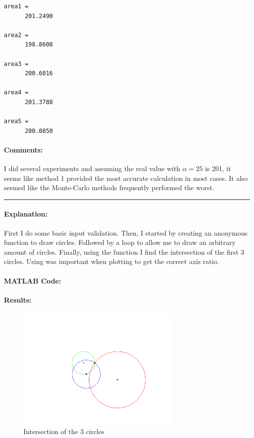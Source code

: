 \begin{verbatim}
area1 =
      201.2490

area2 =
      198.8608

area3 =
      200.6016

area4 =
      201.3788

area5 =
      200.0850
\end{verbatim}

\paragraph{Comments:}
I did several experiments and assuming the real value with $ \alpha =
25 $ is 201, it seems like method 1 provided the most accurate
calculation in most cases. It also seemed like the Monte-Carlo
methods frequently performed the worst.

\bigskip
\hrule


\paragraph{Explanation:}
First I do some basic input validation.
Then, I started by creating an anonymous function to draw circles.
Followed by a loop to allow me to draw an arbitrary amount of circles.
Finally, using the  function I find the intersection
of the first 3 circles.
Using  was important when plotting to get the
correct axis ratio.

\paragraph{MATLAB Code:}

\begin{tiny}
    
\end{tiny}

\paragraph{Results:}

\begin{figure}[h!]
    \centering
    \includegraphics[width=8cm]{figures/ex2.png}
    \caption{Intersection of the 3 circles}
    \label{fig:figures/ex2.png}
\end{figure}

